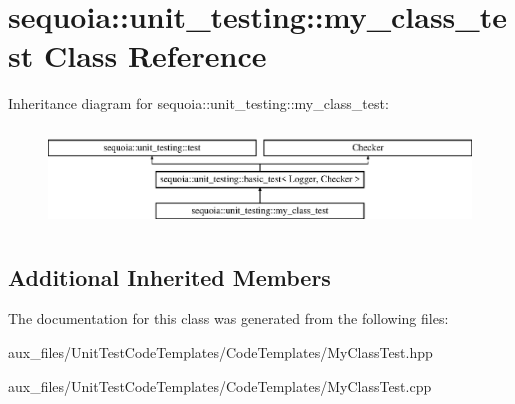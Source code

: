 \hypertarget{classsequoia_1_1unit__testing_1_1my__class__test}{}\section{sequoia\+::unit\+\_\+testing\+::my\+\_\+class\+\_\+test Class Reference}
\label{classsequoia_1_1unit__testing_1_1my__class__test}
Inheritance diagram for sequoia\+::unit\+\_\+testing\+::my\+\_\+class\+\_\+test\+:\begin{figure}[H]
\begin{center}
\leavevmode
\includegraphics[height=2.666667cm]{classsequoia_1_1unit__testing_1_1my__class__test}
\end{center}
\end{figure}
\subsection*{Additional Inherited Members}


The documentation for this class was generated from the following files\+:\begin{DoxyCompactItemize}
\item 
aux\+\_\+files/\+Unit\+Test\+Code\+Templates/\+Code\+Templates/My\+Class\+Test.\+hpp\item 
aux\+\_\+files/\+Unit\+Test\+Code\+Templates/\+Code\+Templates/My\+Class\+Test.\+cpp\end{DoxyCompactItemize}
